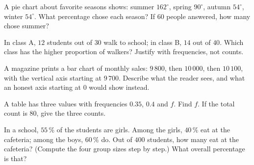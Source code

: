 \begin{exercise}[$\star$]\label{exo:g7:stats:7}
A pie chart about favorite seasons shows: summer $162^\circ$, spring
$90^\circ$, autumn $54^\circ$, winter $54^\circ$. What percentage
chose each season? If $60$ people answered, how many chose summer?
\end{exercise}

\begin{exercise}[$\star\star$]\label{exo:g7:stats:8}
In class A, $12$ students out of $30$ walk to school; in class B,
$14$ out of $40$. Which class has the higher proportion of walkers?
Justify with frequencies, not counts.
\end{exercise}

\begin{exercise}[$\star\star$]\label{exo:g7:stats:9}
A magazine prints a bar chart of monthly sales: $9\,800$, then
$10\,000$, then $10\,100$, with the vertical axis starting at
$9\,700$. Describe what the reader sees, and what an honest axis
starting at $0$ would show instead.
\end{exercise}

\begin{exercise}[$\star\star$]\label{exo:g7:stats:10}
A  table has three values with frequencies $0.35$, $0.4$ and
$f$. Find $f$. If the total count is $80$, give the three counts.
\end{exercise}

\begin{exercise}[$\star\star\star$]\label{exo:g7:stats:11}
In a school, $55\,\%$ of the students are girls. Among the girls,
$40\,\%$ eat at the cafeteria; among the boys, $60\,\%$ do. Out of
$400$ students, how many eat at the cafeteria? (Compute the four
group sizes step by step.) What overall percentage is that?
\end{exercise}
